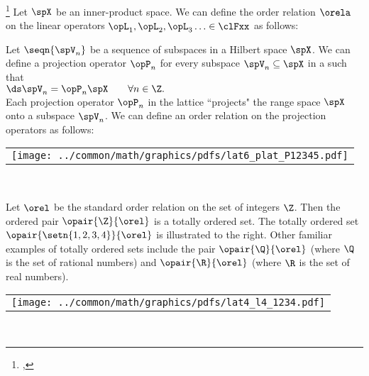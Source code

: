 \begin{example}
\footnote{
  ,
  }
\label{ex:order_operator}
Let $\spX$ be an inner-product space.
We can define the order relation $\orela$ on the linear operators 
$\opL_1,\opL_2,\opL_3\ldots\in\clFxx$ as follows:
\exbox{ \opL_1 \orela \opL_2 \qquad\iffdef\qquad \inprod{\opL_2\vx-\opL_1\vx}{\vx} \ge 0
        \qquad\forall \vx\in\spX}
\end{example}




\begin{minipage}[c]{\tw-43mm}%
  \begin{example}
  \label{ex:order_projection_op}
  \footnotemark
  Let $\seqn{\spV_n}$ be a sequence of subspaces in a Hilbert space $\spX$.
  We can define a projection operator $\opP_n$ for every subspace $\spV_n\subseteq\spX$ 
  in a  such that 
  \\\indentx
    $\ds \spV_n = \opP_n\spX \qquad \forall n\in\Z.$
  \\
  Each projection operator $\opP_n$ in the lattice ``projects" the range space $\spX$
  onto a subspace $\spV_n$.
  We can define an order relation on the projection operators as follows:
  \end{example}
\end{minipage}%
%
\hfill\begin{tabular}{c}\texttt{[image: ../common/math/graphics/pdfs/lat6\_plat\_P12345.pdf]}\end{tabular}\hfill\mbox{}\\%

\begin{minipage}{\tw-20mm}%
  \begin{example}
  \label{ex:order_int}
  Let $\orel$ be the standard order relation on the set of integers $\Z$.
  Then the ordered pair $\opair{\Z}{\orel}$ is a totally ordered set.
  The totally ordered set $\opair{\setn{1,2,3,4}}{\orel}$ is illustrated to the 
  right.
  Other familiar examples of totally ordered sets include the 
  pair $\opair{\Q}{\orel}$ (where $\Q$ is the set of rational numbers)
  and  $\opair{\R}{\orel}$ (where $\R$ is the set of real numbers).
  \end{example}
\end{minipage}%
\hfill\begin{tabular}{c}\texttt{[image: ../common/math/graphics/pdfs/lat4\_l4\_1234.pdf]}\end{tabular}\hfill\mbox{}\\%

